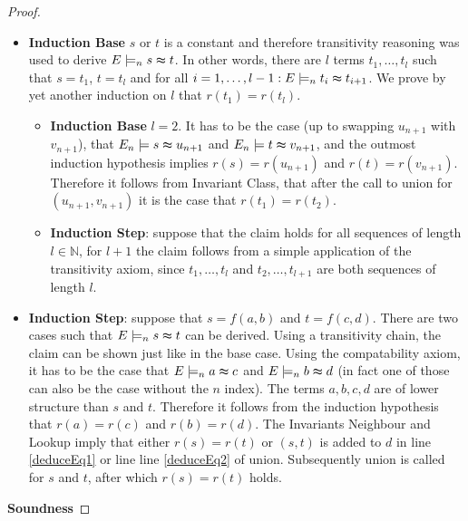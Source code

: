 \begin{proof}
\begin{itemize}
\begin{itemize}
\item \textbf{Induction Base} $s$ or $t$ is a constant and therefore transitivity reasoning was used to derive $E \models_n s \thickapprox t$.
In other words, there are $l$ terms $t_1,\ldots,t_l$ such that $s = t_1$, $t = t_l$ and for all $i = 1,\ldots,l-1: E \models_n t_i \thickapprox t_{i+1}$.
We prove by yet another induction on $l$ that $r(t_1) = r(t_l)$.
\begin{itemize}
\item \textbf{Induction Base} $l = 2$. It has to be the case (up to swapping $u_{n+1}$ with $v_{n+1}$), that $E_n \models s \thickapprox u_{n+1}$ and $E_n \models t \thickapprox v_{n+1}$, and the outmost induction hypothesis implies $r(s) = r(u_{n+1})$ and $r(t) = r(v_{n+1})$.
Therefore it follows from Invariant Class, that after the call to union for $(u_{n+1},v_{n+1})$ it is the case that $r(t_1) = r(t_2)$.

\item \textbf{Induction Step}: suppose that the claim holds for all sequences of length $l \in \mathbb{N}$, for $l+1$ the claim follows from a simple application of the transitivity axiom, since $t_1,\ldots,t_l$ and $t_2,\ldots,t_{l+1}$ are both sequences of length $l$.
\end{itemize}
\item \textbf{Induction Step}: suppose that $s = f(a,b)$ and $t = f(c,d)$.
There are two cases such that $E \models_n s \thickapprox t$ can be derived.
Using a transitivity chain, the claim can be shown just like in the base case.
Using the compatability axiom, it has to be the case that $E \models_n a \thickapprox c$ and $E \models_n b \thickapprox d$ (in fact one of those can also be the case without the $n$ index).
The terms $a,b,c,d$ are of lower structure than $s$ and $t$.
Therefore it follows from the induction hypothesis that $r(a) = r(c)$ and $r(b) = r(d)$.
The Invariants Neighbour and Lookup imply that either $r(s) = r(t)$ or $(s,t)$ is added to $d$ in line \ref{deduceEq1} or line line \ref{deduceEq2} of union.
Subsequently union is called for $s$ and $t$, after which $r(s) = r(t)$ holds.
\end{itemize}
\end{itemize}

\noindent\textbf{Soundness}


\end{proof}
